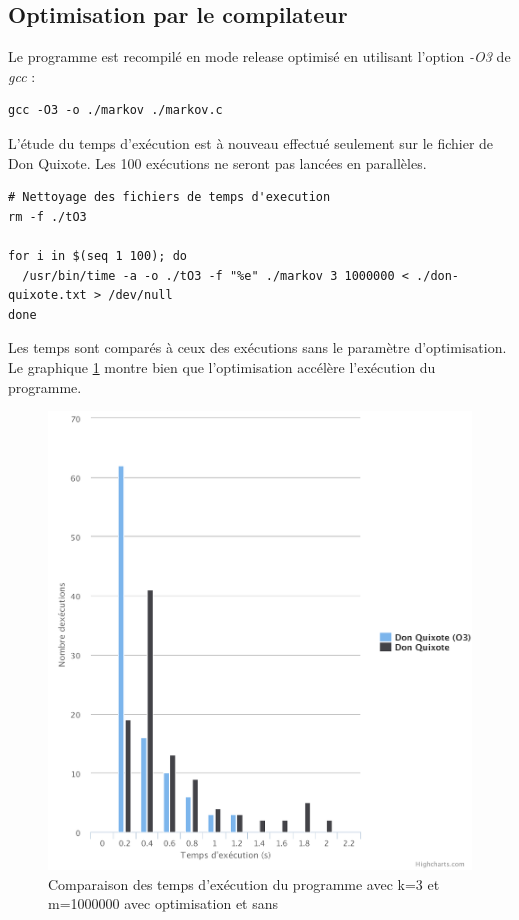 \documentclass[10pt, a4paper]{article}
\begin{document}
\subsection{Optimisation par le compilateur}

Le programme est recompilé en mode release optimisé en utilisant l'option
\emph{-O3} de \emph{gcc} :

\begin{verbatim}
gcc -O3 -o ./markov ./markov.c
\end{verbatim}

L'étude du temps d'exécution est à nouveau effectué seulement sur le fichier de
Don Quixote. Les 100 exécutions ne seront pas lancées en parallèles. \\

\begin{verbatim}
# Nettoyage des fichiers de temps d'execution
rm -f ./tO3

for i in $(seq 1 100); do
  /usr/bin/time -a -o ./tO3 -f "%e" ./markov 3 1000000 < ./don-quixote.txt > /dev/null
done
\end{verbatim}

Les temps sont comparés à ceux des exécutions sans le paramètre d'optimisation.
Le graphique \ref{fig:chart_k3_m1000000_o3} montre bien que l'optimisation
accélère l'exécution du programme. \\

\begin{figure}[ht]
    \centering
    \includegraphics[width=1.0\textwidth]{chart_k3_m1000000_o3}
    \caption{Comparaison des temps d'exécution du programme avec k=3 et m=1000000 avec optimisation et sans}
    \label{fig:chart_k3_m1000000_o3}
\end{figure}
\end{document}
